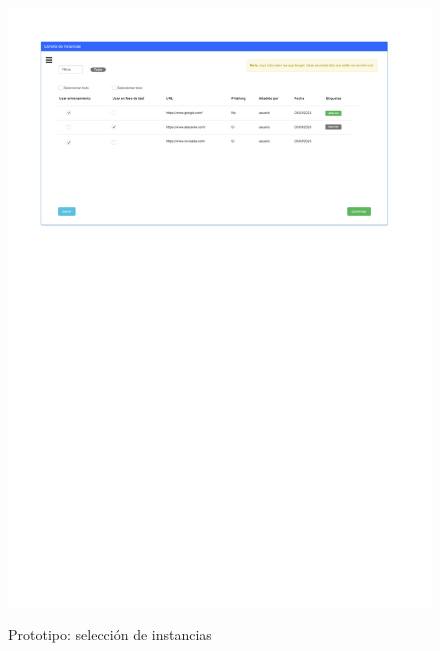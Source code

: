 \begin{figure}[h]
	\caption{Prototipo: selección de instancias}
	\centering
	\includegraphics[width=\textwidth]{../img/anexos/mockups/8-mockups-select_instances}
	\label{mock:instance-selection}
\end{figure}

